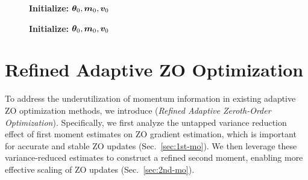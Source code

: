 \begin{figure}[t]
\vspace{-2mm}
\begin{minipage}{0.48\textwidth}
\begin{algorithm}[H]
\DontPrintSemicolon
\caption{\base{}}\label{alg:adam}
\textbf{Initialize:} ${\bm{\theta}}_0, {\bm{m}}_0, {\bm{v}}_0$

\end{algorithm}
\end{minipage}
\hfill
\begin{minipage}{0.48\textwidth}
\begin{algorithm}[H]
\DontPrintSemicolon
\caption{\ours{}}\label{alg:ours}
\textbf{Initialize:} ${\bm{\theta}}_0, {\bm{m}}_0, {\bm{v}}_0$

\end{algorithm}
\end{minipage}
\end{figure}


\section{Refined Adaptive ZO Optimization}
To address the underutilization of momentum information in existing adaptive ZO optimization methods, we introduce \ours{} (\textit{Refined Adaptive Zeroth-Order Optimization}). Specifically, we first analyze the untapped variance reduction effect of first moment estimates on ZO gradient estimation, which is important for accurate and stable ZO updates (Sec.~\ref{sec:1st-mo}). We then leverage these variance-reduced estimates to construct a refined second moment, enabling more effective scaling of ZO updates (Sec.~\ref{sec:2nd-mo}).

